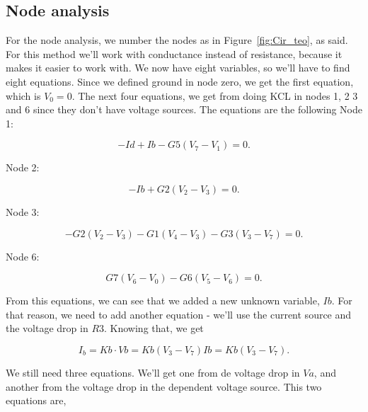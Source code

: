 \subsection{Node analysis}
\label{ssec:Node analysis}

\par \noindent For the node analysis, we number the nodes as in Figure~\ref{fig:Cir_teo}, as said. For this method we'll work with conductance instead of resistance, because it makes it easier to work with. We now have eight variables, so we'll have to find eight equations. Since we defined ground in node zero, we get the first equation, which is $V_0=0$. The next four equations, we get from doing KCL in nodes 1, 2 3 and 6 since they don't have voltage sources. The equations are the following
\vspace{5mm}
Node 1:

 \begin{equation}
  -Id + Ib - G5(V_7-V_1) = 0.
  \label{eq:N1}
\end{equation}

Node 2:

 \begin{equation}
  -Ib + G2(V_2-V_3) = 0.
  \label{eq:N2}
\end{equation}

Node 3:

 \begin{equation}
  -G2(V_2-V_3)-G1(V_4-V_3)-G3(V_3-V_7) = 0.
  \label{eq:N3}
\end{equation}

Node 6:

 \begin{equation}
  G7(V_6-V_0)-G6(V_5-V_6) = 0.
  \label{eq:N6}
\end{equation}

\par \noindent From this equations, we can see that we added a new unknown variable, $Ib$. For that reason, we need to add another equation - we'll use the current source and the voltage drop in $R3$. Knowing that, we get

 \begin{equation}
  I_b = Kb \cdot Vb = Kb(V_3-V_7) Ib = Kb(V_3-V_7).
  \label{eq:Ib}
\end{equation}

\par \noindent We still need three equations. We'll get one from de voltage drop in $Va$, and another from the voltage drop in the dependent voltage source. This two equations are,

